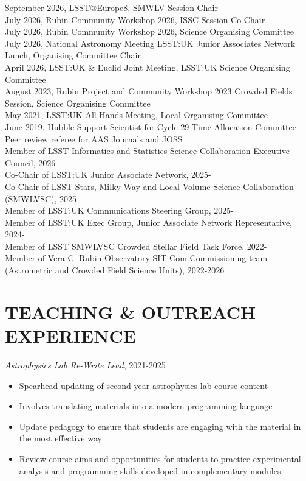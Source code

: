 \documentclass[letter, margin, 10pt]{res} %
\begin{document}
\begin{resume}
September 2026, LSST@Europe8, SMWLV Session Chair\\
July 2026, Rubin Community Workshop 2026, ISSC Session Co-Chair\\
July 2026, Rubin Community Workshop 2026, Science Organising Committee\\
July 2026, National Astronomy Meeting LSST:UK Junior Associates Network Lunch, Organising Committee Chair\\
April 2026, LSST:UK \& Euclid Joint Meeting, LSST:UK Science Organising Committee\\
August 2023, Rubin Project and Community Workshop 2023 Crowded Fields Session, Science Organising Committee\\
May 2021, LSST:UK All-Hands Meeting, Local Organising Committee\\
June 2019, Hubble Support Scientist for Cycle 29 Time Allocation Committee\\
Peer review referee for AAS Journals and JOSS\\
Member of LSST Informatics and Statistics Science Collaboration Executive Council, 2026-\\
Co-Chair of LSST:UK Junior Associate Network, 2025-\\
Co-Chair of LSST Stars, Milky Way and Local Volume Science Collaboration (SMWLVSC), 2025-\\
Member of LSST:UK Communications Steering Group, 2025-\\
Member of LSST:UK Exec Group, Junior Associate Network Representative, 2024-\\
Member of LSST SMWLVSC Crowded Stellar Field Task Force, 2022-\\
Member of Vera C. Rubin Observatory SIT-Com Commissioning team (Astrometric and Crowded Field Science Units), 2022-2026\\

 \vspace{-6pt}
\section{TEACHING \& OUTREACH EXPERIENCE}

{\sl Astrophysics Lab Re-Write Lead}, 2021-2025
\begin{itemize}[noitemsep,topsep=0pt,parsep=0pt,partopsep=0pt]
\item Spearhead updating of second year astrophysics lab course content
\item Involves translating materials into a modern programming language
\item Update pedagogy to ensure that students are engaging with the material in the most effective way
\item Review course aims and opportunities for students to practice experimental analysis and programming skills developed in complementary modules
\end{itemize}


\end{resume}
\end{document}
